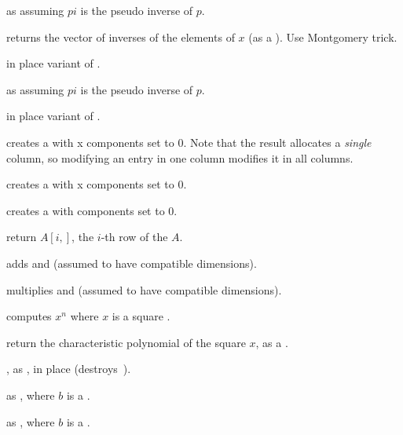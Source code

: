  as 
assuming $pi$ is the pseudo inverse of $p$.

 returns the vector of inverses of the elements
of $x$ (as a ). Use Montgomery trick.

 in place variant of .

 as 
assuming $pi$ is the pseudo inverse of $p$.

 in place variant of
.

 creates a  with  x 
components set to $0$. Note that the result allocates a
\emph{single} column, so modifying an entry in one column modifies it in
all columns.

 creates a  with  x
 components set to $0$.

 creates a  with  components set to
$0$.

 return $A[i,]$, the $i$-th row of the
 $A$.

 adds  and 
(assumed to have compatible dimensions).

 multiplies   and 
(assumed to have compatible dimensions).

 computes $x^n$ where $x$ is a
square .

 return the characteristic polynomial of
the square  $x$, as a .



, as , in place
(destroys~).

 as , where $b$ is a
.

 as , where $b$ is
a .


